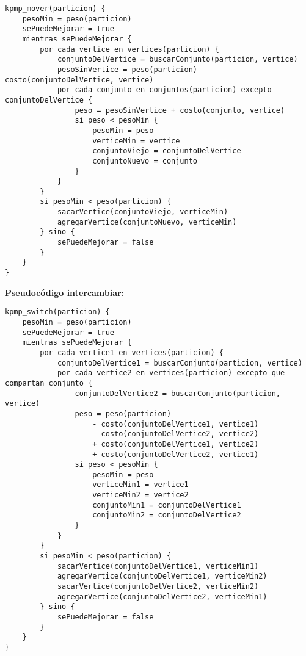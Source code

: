 \begin{verbatim}
kpmp_mover(particion) {
    pesoMin = peso(particion)
    sePuedeMejorar = true
    mientras sePuedeMejorar {
        por cada vertice en vertices(particion) {
            conjuntoDelVertice = buscarConjunto(particion, vertice)
            pesoSinVertice = peso(particion) - costo(conjuntoDelVertice, vertice)
            por cada conjunto en conjuntos(particion) excepto conjuntoDelVertice {
                peso = pesoSinVertice + costo(conjunto, vertice)
                si peso < pesoMin {
                    pesoMin = peso
                    verticeMin = vertice
                    conjuntoViejo = conjuntoDelVertice
                    conjuntoNuevo = conjunto
                }
            }
        }
        si pesoMin < peso(particion) {
            sacarVertice(conjuntoViejo, verticeMin)
            agregarVertice(conjuntoNuevo, verticeMin)
        } sino {
            sePuedeMejorar = false
        }
    }
}
\end{verbatim}

\newpage

\textbf{Pseudocódigo intercambiar:}

\vspace*{0.3cm}

\begin{verbatim}
kpmp_switch(particion) {
    pesoMin = peso(particion)
    sePuedeMejorar = true
    mientras sePuedeMejorar {
        por cada vertice1 en vertices(particion) {
            conjuntoDelVertice1 = buscarConjunto(particion, vertice)
            por cada vertice2 en vertices(particion) excepto que compartan conjunto {
                conjuntoDelVertice2 = buscarConjunto(particion, vertice)
                peso = peso(particion)
                    - costo(conjuntoDelVertice1, vertice1)
                    - costo(conjuntoDelVertice2, vertice2)
                    + costo(conjuntoDelVertice1, vertice2)
                    + costo(conjuntoDelVertice2, vertice1)
                si peso < pesoMin {
                    pesoMin = peso
                    verticeMin1 = vertice1
                    verticeMin2 = vertice2
                    conjuntoMin1 = conjuntoDelVertice1
                    conjuntoMin2 = conjuntoDelVertice2
                }
            }
        }
        si pesoMin < peso(particion) {
            sacarVertice(conjuntoDelVertice1, verticeMin1)
            agregarVertice(conjuntoDelVertice1, verticeMin2)
            sacarVertice(conjuntoDelVertice2, verticeMin2)
            agregarVertice(conjuntoDelVertice2, verticeMin1)
        } sino {
            sePuedeMejorar = false
        }
    }
}
\end{verbatim}



